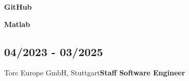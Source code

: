 \documentclass{mycv}
\begin{document}
\begin{paracol}{2}
        \begin{minipage}[c]{0.31\textwidth}
            \begin{flushright}
                {\bfseries GitHub}\\
                {\footnotesize \href{https://github.com/chandramouli6890/}{}}
            \end{flushright}
        \end{minipage}
        \begin{minipage}{0.05\textwidth}
            \githubIcon
        \end{minipage}
        \vspace{3mm}


        \begin{minipage}[c]{0.31\textwidth}
            \begin{flushright}
                {\bfseries Matlab}\\
                {\footnotesize
                    \href{https://de.mathworks.com/matlabcentral/profile/authors/4267772}{}}
            \end{flushright}
        \end{minipage}
        \begin{minipage}{0.05\textwidth}
            \matlabIcon
        \end{minipage}

\switchcolumn

{
    \subsection{04/2023 - 03/2025}{Torc Europe GmbH, Stuttgart}{\bfseries Staff Software Engineer}
          \begin{itemize}


\end{itemize}}
\end{paracol}
\end{document}
